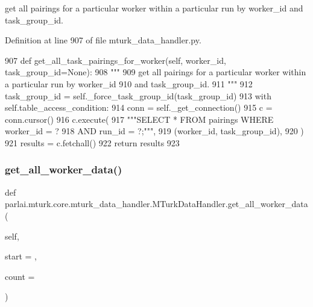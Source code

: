\begin{DoxyVerb}get all pairings for a particular worker within a particular run by worker_id
and task_group_id.
\end{DoxyVerb}
 

Definition at line 907 of file mturk\+\_\+data\+\_\+handler.\+py.


\begin{DoxyCode}
907     \textcolor{keyword}{def }get\_all\_task\_pairings\_for\_worker(self, worker\_id, task\_group\_id=None):
908         \textcolor{stringliteral}{"""}
909 \textcolor{stringliteral}{        get all pairings for a particular worker within a particular run by worker\_id}
910 \textcolor{stringliteral}{        and task\_group\_id.}
911 \textcolor{stringliteral}{        """}
912         task\_group\_id = self.\_force\_task\_group\_id(task\_group\_id)
913         with self.table\_access\_condition:
914             conn = self.\_get\_connection()
915             c = conn.cursor()
916             c.execute(
917                 \textcolor{stringliteral}{"""SELECT * FROM pairings WHERE worker\_id = ?}
918 \textcolor{stringliteral}{                         AND run\_id = ?;"""},
919                 (worker\_id, task\_group\_id),
920             )
921             results = c.fetchall()
922             \textcolor{keywordflow}{return} results
923 
\end{DoxyCode}
\mbox{\label{classparlai_1_1mturk_1_1core_1_1mturk__data__handler_1_1MTurkDataHandler_a188c46e50f06129a289a065809290bf3}} 
\subsubsection{\texorpdfstring{get\+\_\+all\+\_\+worker\+\_\+data()}{get\_all\_worker\_data()}}
{\footnotesize\ttfamily def parlai.\+mturk.\+core.\+mturk\+\_\+data\+\_\+handler.\+M\+Turk\+Data\+Handler.\+get\+\_\+all\+\_\+worker\+\_\+data (\begin{DoxyParamCaption}\item[{}]{self,  }\item[{}]{start = {},  }\item[{}]{count = {} }\end{DoxyParamCaption})}

